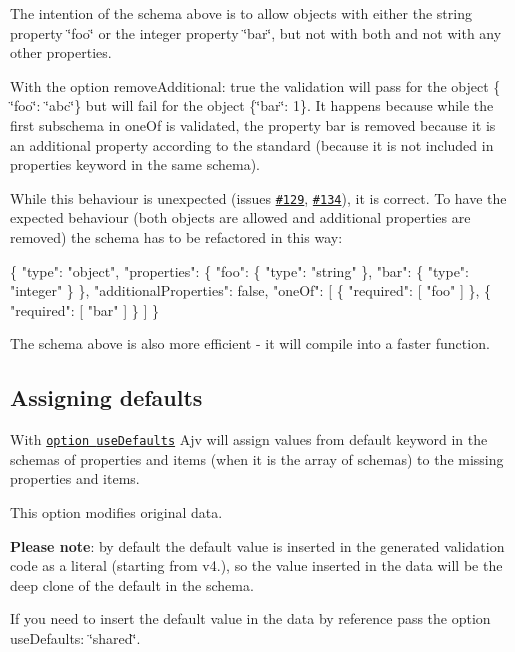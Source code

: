 The intention of the schema above is to allow objects with either the string property \char`\"{}foo\char`\"{} or the integer property \char`\"{}bar\char`\"{}, but not with both and not with any other properties.

With the option {\ttfamily remove\+Additional\+: true} the validation will pass for the object {\ttfamily \{ \char`\"{}foo\char`\"{}\+: \char`\"{}abc\char`\"{}\}} but will fail for the object {\ttfamily \{\char`\"{}bar\char`\"{}\+: 1\}}. It happens because while the first subschema in {\ttfamily one\+Of} is validated, the property {\ttfamily bar} is removed because it is an additional property according to the standard (because it is not included in {\ttfamily properties} keyword in the same schema).

While this behaviour is unexpected (issues \href{https://github.com/epoberezkin/ajv/issues/129}{\tt \#129}, \href{https://github.com/epoberezkin/ajv/issues/134}{\tt \#134}), it is correct. To have the expected behaviour (both objects are allowed and additional properties are removed) the schema has to be refactored in this way\+:


\begin{DoxyCode}
\{
  "type": "object",
  "properties": \{
    "foo": \{ "type": "string" \},
    "bar": \{ "type": "integer" \}
  \},
  "additionalProperties": false,
  "oneOf": [
    \{ "required": [ "foo" ] \},
    \{ "required": [ "bar" ] \}
  ]
\}
\end{DoxyCode}


The schema above is also more efficient -\/ it will compile into a faster function.

\subsection*{Assigning defaults}

With \href{#options}{\tt option {\ttfamily use\+Defaults}} Ajv will assign values from {\ttfamily default} keyword in the schemas of {\ttfamily properties} and {\ttfamily items} (when it is the array of schemas) to the missing properties and items.

This option modifies original data.

{\bfseries Please note}\+: by default the default value is inserted in the generated validation code as a literal (starting from v4.), so the value inserted in the data will be the deep clone of the default in the schema.

If you need to insert the default value in the data by reference pass the option {\ttfamily use\+Defaults\+: \char`\"{}shared\char`\"{}}.

